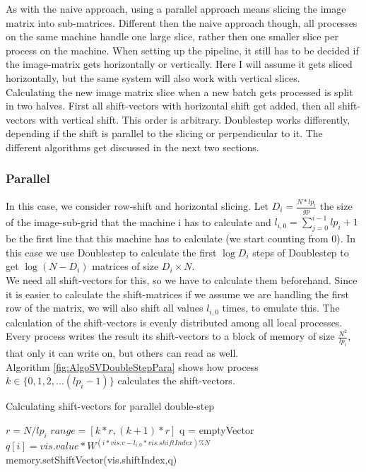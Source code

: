 \documentclass[12pt]{article}
\begin{document}
As with the naive approach, using a parallel approach means slicing the image matrix into sub-matrices. Different then the naive approach though, all processes on the same machine handle one large slice, rather then one smaller slice per process on the machine. When setting up the pipeline, it still has to be decided if the image-matrix gets horizontally or vertically. Here I will assume it gets sliced horizontally, but the same system will also work with vertical slices.\\

Calculating the new image matrix slice when a new batch gets processed is split in two halves. First all shift-vectors with horizontal shift get added, then all shift-vectors with vertical shift. This order is arbitrary. Doublestep works differently, depending if the shift is parallel to the slicing or perpendicular to it. The different algorithms get discussed in the next two sections.

\subsubsection{ Parallel }

In this case, we consider row-shift and horizontal slicing. Let $D_i=\frac{N*lp_i}{gp}$ the size of the image-sub-grid that the machine i has to calculate and $l_{i,0}=\sum_{j=0}^{i-1}lp_i+1$ be the first line that this machine has to calculate (we start counting from 0). In this case we use Doublestep to calculate the first $\log{D_i}$ steps of Doublestep to get $\log{(N-D_i)}$ matrices of size $D_i \times N$.\\

We need all shift-vectors for this, so we have to calculate them beforehand. Since it is easier to calculate the shift-matrices if we assume we are handling the first row of the matrix, we will also shift all values $l_ {i,0}$ times, to emulate this. The calculation of the shift-vectors is evenly distributed among all local processes. Every process writes the result its shift-vectors to a block of memory of size  $\frac{N^2}{lp_i}$, that only it can write on, but others can read as well.\\

Algorithm \ref{fig:AlgoSVDoubleStepPara} shows how process $k\in \{0,1,2,...(lp_i-1)\}$ calculates the shift-vectors. \\

\begin{algorithm}
\caption{Calculating shift-vectors for parallel double-step}\label{euclid}
\label{fig:AlgoSVDoubleStepPara}
\begin{algorithmic}[1]
\State $r = N/lp_i$
\State $range = [k*r,(k+1)*r]$
      \State q = emptyVector
            \State $q[i]=vis.value*W^{(i*vis.v-l_{i,0}*vis.shiftIndex)\%N}$
      \EndFor
      \State memory.setShiftVector(vis.shiftIndex,q)
\EndFor
\end{algorithmic}
\end{algorithm}
\end{document}
